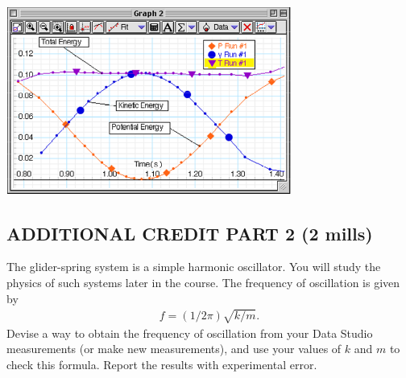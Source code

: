 \begin{center} \includegraphics*[width=0.7\textwidth]{imgs/6labs/6Alab/6Aexp4/exp4_last.png} \end{center}

\subsection*{ADDITIONAL CREDIT PART 2 (2 mills)}

The glider-spring system is a simple harmonic oscillator.  You will study the physics of such systems later in the course.   The frequency of oscillation is given by
\begin{align} f = (1/2\pi)\sqrt{k/m}. \end{align}
Devise a way to obtain the frequency of oscillation from your Data Studio measurements (or make new measurements), and use your values of \(k\) and \(m\) to check this formula.  Report the results with experimental error.
